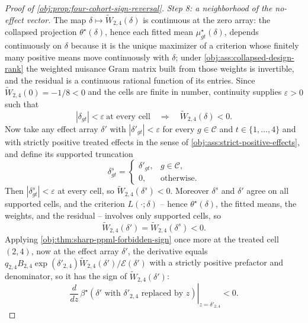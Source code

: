 \documentclass[11pt]{article}
\begin{document}
\begin{proof}[Proof of \cref{obj:prop:four-cohort-sign-reversal}]
\textit{Step 8: a neighborhood of the no-effect vector.} The map \(\delta\mapsto\widetilde W_{2,4}(\delta)\) is continuous at the zero array: the collapsed projection \(\theta^\star(\delta)\), hence each fitted mean \(\mu^\star_{gt}(\delta)\), depends continuously on \(\delta\) because it is the unique maximizer of a criterion whose finitely many positive means move continuously with \(\delta\); under \cref{obj:ass:collapsed-design-rank} the weighted nuisance Gram matrix built from those weights is invertible, and the residual is a continuous rational function of its entries.
Since \(\widetilde W_{2,4}(0)=-1/8<0\) and the cells are finite in number, continuity supplies \(\varepsilon>0\) such that
\[
|\delta_{gt}|<\varepsilon\ \text{at every cell}
\quad\Longrightarrow\quad
\widetilde W_{2,4}(\delta)<0 .
\]
Now take any effect array \(\delta'\) with \(|\delta'_{gt}|<\varepsilon\) for every \(g\in\mathcal C\) and \(t\in\{1,\ldots,4\}\) and with strictly positive treated effects in the sense of \cref{obj:ass:strict-positive-effects}, and define its supported truncation
\[
\delta^s_{gt}=
\begin{cases}
\delta'_{gt}, & g\in\mathcal C,\\
0, & \text{otherwise} .
\end{cases}
\]
Then \(|\delta^s_{gt}|<\varepsilon\) at every cell, so \(\widetilde W_{2,4}(\delta^s)<0\). Moreover \(\delta^s\) and \(\delta'\) agree on all supported cells, and the criterion \(L(\cdot;\delta)\) -- hence \(\theta^\star(\delta)\), the fitted means, the weights, and the residual -- involves only supported cells, so
\[
\widetilde W_{2,4}(\delta')=\widetilde W_{2,4}(\delta^s)<0 .
\]
Applying \cref{obj:thm:sharp-ppml-forbidden-sign} once more at the treated cell \((2,4)\), now at the effect array \(\delta'\), the derivative equals \(q_{2,4}B_{2,4}\exp(\delta'_{2,4})\widetilde W_{2,4}(\delta')/\mathcal E(\delta')\) with a strictly positive prefactor and denominator, so it has the sign of \(\widetilde W_{2,4}(\delta')\):
\[
\left.
\frac{d}{dz}\,
\beta^\star\!\left(\delta'\text{ with }\delta'_{2,4}\text{ replaced by }z\right)
\right|_{z=\delta'_{2,4}}
<0 .
\]
\end{proof}
\end{document}
